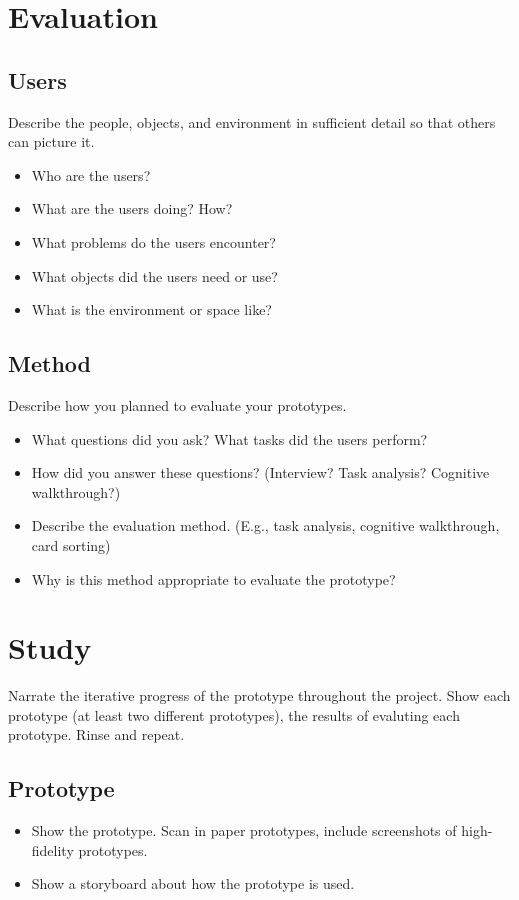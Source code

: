 \documentclass[11pt]{article} %
\begin{document}
\section{Evaluation}
\subsection{Users}
Describe the people, objects, and environment in sufficient detail so that others can picture it.
\begin{itemize}
\item Who are the users?
\item What are the users doing? How?
\item What problems do the users encounter?
\item What objects did the users need or use?
\item What is the environment or space like?
\end{itemize}

\subsection{Method}
Describe how you planned to evaluate your prototypes.
\begin{itemize}
\item What questions did you ask? What tasks did the users perform?
\item How did you answer these questions? (Interview? Task analysis? Cognitive walkthrough?)
\item Describe the evaluation method. (E.g., task analysis, cognitive walkthrough, card sorting)
\item Why is this method appropriate to evaluate the prototype?
\end{itemize}

\section{Study}
Narrate the iterative progress of the prototype throughout the project.
Show each prototype (at least two different prototypes), the results of evaluting each prototype. Rinse and repeat.

\subsection{Prototype}
\begin{itemize}
\item Show the prototype. Scan in paper prototypes, include screenshots of high-fidelity prototypes.
\item Show a storyboard about how the prototype is used. 
\end{itemize}
\end{document}
